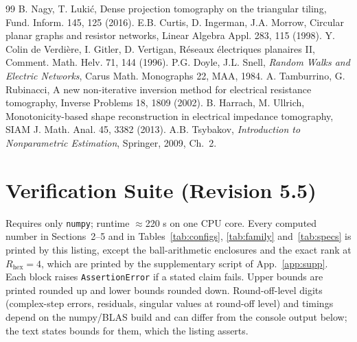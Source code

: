 \documentclass[11pt,a4paper]{article}
\theoremstyle{definition}
\theoremstyle{remark}
\begin{document}
\begin{thebibliography}{99}
 B. Nagy, T. Luki\'c, Dense projection tomography on the triangular tiling, Fund. Inform. 145, 125 (2016).
 E.B. Curtis, D. Ingerman, J.A. Morrow, Circular planar graphs and resistor networks, Linear Algebra Appl. 283, 115 (1998).
 Y. Colin de Verdi\`ere, I. Gitler, D. Vertigan, R\'eseaux \'electriques planaires II, Comment. Math. Helv. 71, 144 (1996).
 P.G. Doyle, J.L. Snell, \textit{Random Walks and Electric Networks}, Carus Math. Monographs 22, MAA, 1984.
 A. Tamburrino, G. Rubinacci, A new non-iterative inversion method for electrical resistance tomography, Inverse Problems 18, 1809 (2002).
 B. Harrach, M. Ullrich, Monotonicity-based shape reconstruction in electrical impedance tomography, SIAM J. Math. Anal. 45, 3382 (2013).
 A.B. Tsybakov, \textit{Introduction to Nonparametric Estimation}, Springer, 2009, Ch.~2.
\end{thebibliography}

\appendix
\section{Verification Suite (Revision 5.5)}\label{app:code}
Requires only \texttt{numpy}; runtime $\approx$220 s on one CPU core. Every computed number in Sections~2--5 and in Tables~\ref{tab:configs}, \ref{tab:family} and~\ref{tab:specs} is printed by this listing, except the ball-arithmetic enclosures and the exact rank at $R_{\text{hex}} = 4$, which are printed by the supplementary script of App.~\ref{app:supp}. Each block raises \texttt{AssertionError} if a stated claim fails. Upper bounds are printed rounded up and lower bounds rounded down. Round-off-level digits (complex-step errors, residuals, singular values at round-off level) and timings depend on the numpy/BLAS build and can differ from the console output below; the text states bounds for them, which the listing asserts.
\end{document}
